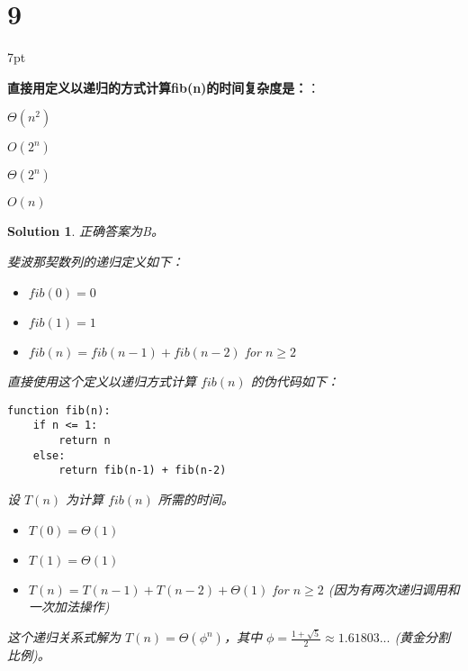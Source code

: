 \documentclass[UTF8]{report}
\newtheorem{solution}{Solution}
\theoremstyle{MyLineTheoremStyle} %
\theoremstyle{MyBlockTheoremStyle} %
\theoremstyle{MySubsubsectionStyle} %
\newenvironment{graybox}{%
        \def\FrameCommand{%
        \hspace{1pt}%
        {\color{gray}\small \vrule width 2pt}%
        {\color{graybox_color}\vrule width 4pt}%
        \colorbox{graybox_color}%
        }%
        \MakeFramed{\advance\hsize-\width\FrameRestore}%
        \noindent\hspace{-4.55pt}%
        \begin{adjustwidth}{}{7pt}%
        \vspace{2pt}\vspace{2pt}%
        }
        {%
        \vspace{2pt}\end{adjustwidth}\endMakeFramed%
        }
\begin{document}
\section*{9}

\begin{graybox}
\textbf{直接用定义以递归的方式计算fib(n)的时间复杂度是：}：
\begin{circledenum}
    \item $\Theta(n^2)$
    \item $O(2^n)$
    \item $\Theta(2^n)$
    \item $O(n)$
\end{circledenum}
\end{graybox}

\begin{solution}
正确答案为B。

斐波那契数列的递归定义如下：
\begin{itemize}
    \item $fib(0) = 0$
    \item $fib(1) = 1$
    \item $fib(n) = fib(n-1) + fib(n-2)$ for $n \ge 2$
\end{itemize}
直接使用这个定义以递归方式计算 $fib(n)$ 的伪代码如下：
\begin{verbatim}
function fib(n):
    if n <= 1:
        return n
    else:
        return fib(n-1) + fib(n-2)
\end{verbatim}
设 $T(n)$ 为计算 $fib(n)$ 所需的时间。
\begin{itemize}
    \item $T(0) = \Theta(1)$
    \item $T(1) = \Theta(1)$
    \item $T(n) = T(n-1) + T(n-2) + \Theta(1)$ for $n \ge 2$ (因为有两次递归调用和一次加法操作)
\end{itemize}
这个递归关系式解为 $T(n) = \Theta(\phi^n)$，其中 $\phi = \frac{1+\sqrt{5}}{2} \approx 1.61803...$ (黄金分割比例)。


\end{solution}
\end{document}
